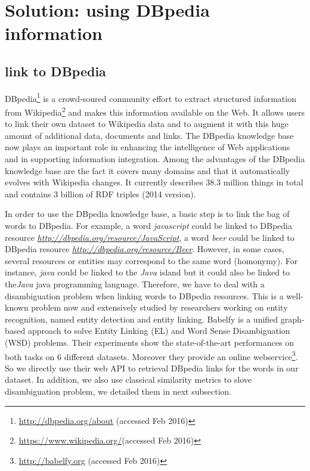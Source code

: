 \section{Solution: using DBpedia information}
\label{sec:chp6secSolution}

\subsection{link to DBpedia}

DBpedia\footnote{\url{http://dbpedia.org/about} (accessed Feb 2016)} is a crowd-soured community effort to extract structured information from Wikipedia\footnote{\url{https://www.wikipedia.org/}(accessed Feb 2016)} and makes this information available on the Web. It allows users to link their own dataset to Wikipedia data and to augment it with this huge amount of additional data, documents and links. The DBpedia knowledge base now plays an important role in enhancing the intelligence of Web applications and in supporting information integration. Among the advantages of the DBpedia knowledge base are the fact it covers many domains and that it automatically evolves with Wikipedia changes. It currently describes 38.3 million things in total and contains 3 billion of RDF triples (2014 version).


In order to use the DBpedia knowledge base, a basic step is to link the bag of words to DBpedia. For example, a word \textit{javascript} could be linked to DBpedia resource \textit{\url{http://dbpedia.org/resource/JavaScript}}, a word \textit{beer} could be linked to DBpedia resource	\textit{\url{http://dbpedia.org/resource/Beer}}. However, in some cases, several resources or entities may correspond to the same word (homonymy). For instance, \textit{java} could be linked to the \textit{Java} island but it could also be linked to the\textit{Java}  java programming language. Therefore, we have to deal with a disambiguation problem when linking words to DBpedia resources. This is a well-known problem now and extensively studied by researchers working on entity recognition, named entity detection and entity linking.  Babelfy\cite{chp6babelfy:Moroetal:14tacl} is a unified graph-based approach to solve Entity Linking (EL) and Word Sense Disambiguation (WSD) problems. Their experiments show the state-of-the-art performances on both tasks on 6 different datasets. Moreover they provide an online webservice\footnote{\url{http://babelfy.org} (accessed Feb 2016)}. So we directly use their web API to retrieval DBpedia links for the words in our dataset. In addition, we also use classical similarity metrics to slove disambiguation problem, we detailed them in next subsection.

